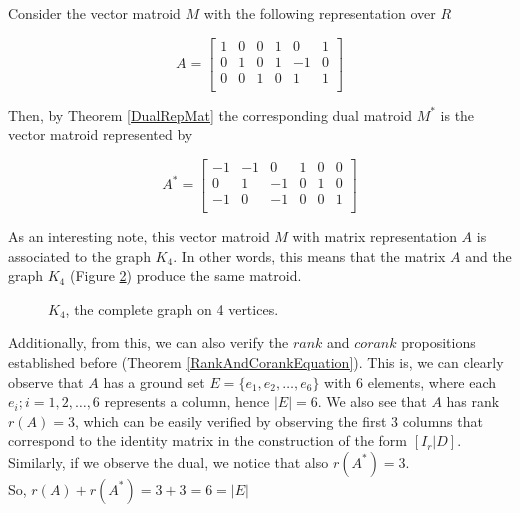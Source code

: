 \begin{exmp}
    Consider the vector matroid $M$ with the following representation over $R$
    \begin{figure}[H]
        $$A = \begin{bmatrix}
            1 & 0 & 0 & 1 & 0 & 1 \\
            0 & 1 & 0 & 1 & -1 & 0 \\
            0 & 0 & 1 & 0 & 1 & 1 \\
        \end{bmatrix}$$
        \label{MatOfK4}
    \end{figure}
Then, by Theorem \ref{DualRepMat} the corresponding dual matroid $M^*$ is the vector matroid represented by 
    \begin{figure}[H]
        $$A^* = \begin{bmatrix}
            -1 & -1 & 0 & 1 & 0 & 0 \\
            0 & 1 & -1 & 0 & 1 & 0 \\
            -1 & 0 & -1 & 0 & 0 & 1 \\
        \end{bmatrix}$$
    \end{figure}
As an interesting note, this vector matroid $M$ with matrix representation $A$ is associated to the graph $K_4$. In other words, this means that the matrix $A$ and the graph $K_4$ (Figure \ref{K4Graph}) produce the same matroid.

       \begin{figure}[H]
        \centering
            \caption{$K_4$, the complete graph on 4 vertices.}
            \label{K4Graph}
        \end{figure}

Additionally, from this, we can also verify the $rank$ and $corank$ propositions established before (Theorem \ref{RankAndCorankEquation}). This is, we can clearly observe that $A$ has a ground set $E=\{e_1, e_2, \dots, e_6\}$ with 6 elements, where each $e_i; i =1,2, \dots,6$ represents a column, hence $|E|=6$. We also see that $A$ has rank $r(A)=3$, which can be easily verified by observing the first 3 columns that correspond to the identity matrix in the construction of the form $[I_r|D]$. Similarly, if we observe the dual, we notice that also $r(A^*)=3$. \\So, $r(A)+r(A^*)= 3 + 3 = 6 = |E|$
\end{exmp}

